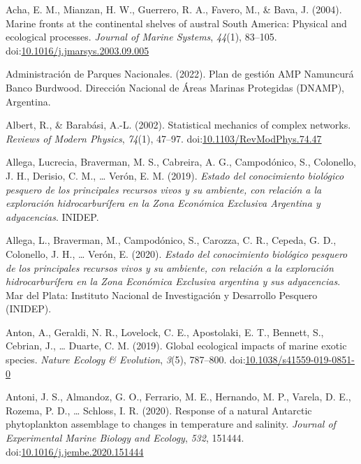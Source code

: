 \documentclass[
]{article}
\newlength{\cslhangindent}
\newlength{\cslentryspacingunit} %
\newenvironment{CSLReferences}[2] %
 {%
  \setlength{\parindent}{0pt}
  \ifodd #1
  \let\oldpar\par
  \def\par{\hangindent=\cslhangindent\oldpar}
  \fi
  \setlength{\parskip}{#2\cslentryspacingunit}
 }%
 {}
\begin{document}
\hypertarget{refs}{}
\begin{CSLReferences}{1}{0}
\leavevmode{}%
Acha, E. M., Mianzan, H. W., Guerrero, R. A., Favero, M., \& Bava, J.
(2004). Marine fronts at the continental shelves of austral {South
America}: {Physical} and ecological processes. \emph{Journal of Marine
Systems}, \emph{44}(1), 83--105.
doi:\href{https://doi.org/10.1016/j.jmarsys.2003.09.005}{10.1016/j.jmarsys.2003.09.005}

\leavevmode{}%
Administración de Parques Nacionales. (2022). {Plan de gestión AMP
Namuncurá Banco Burdwood}. {Dirección Nacional de Áreas Marinas
Protegidas (DNAMP), Argentina}.

\leavevmode{}%
Albert, R., \& Barabási, A.-L. (2002). Statistical mechanics of complex
networks. \emph{Reviews of Modern Physics}, \emph{74}(1), 47--97.
doi:\href{https://doi.org/10.1103/RevModPhys.74.47}{10.1103/RevModPhys.74.47}

\leavevmode{}%
Allega, Lucrecia, Braverman, M. S., Cabreira, A. G., Campodónico, S.,
Colonello, J. H., Derisio, C. M., \ldots{} Verón, E. M. (2019).
\emph{{Estado del conocimiento biológico pesquero de los principales
recursos vivos y su ambiente, con relación a la exploración
hidrocarburífera en la Zona Económica Exclusiva Argentina y
adyacencias}}. {INIDEP}.

\leavevmode{}%
Allega, L., Braverman, M., Campodónico, S., Carozza, C. R., Cepeda, G.
D., Colonello, J. H., \ldots{} Verón, E. (2020). \emph{{Estado del
conocimiento biológico pesquero de los principales recursos vivos y su
ambiente, con relación a la exploración hidrocarburífera en la Zona
Económica Exclusiva argentina y sus adyacencias}}. {Mar del Plata}:
{Instituto Nacional de Investigación y Desarrollo Pesquero (INIDEP)}.

\leavevmode{}%
Anton, A., Geraldi, N. R., Lovelock, C. E., Apostolaki, E. T., Bennett,
S., Cebrian, J., \ldots{} Duarte, C. M. (2019). Global ecological
impacts of marine exotic species. \emph{Nature Ecology \& Evolution},
\emph{3}(5), 787--800.
doi:\href{https://doi.org/10.1038/s41559-019-0851-0}{10.1038/s41559-019-0851-0}

\leavevmode{}%
Antoni, J. S., Almandoz, G. O., Ferrario, M. E., Hernando, M. P.,
Varela, D. E., Rozema, P. D., \ldots{} Schloss, I. R. (2020). Response
of a natural {Antarctic} phytoplankton assemblage to changes in
temperature and salinity. \emph{Journal of Experimental Marine Biology
and Ecology}, \emph{532}, 151444.
doi:\href{https://doi.org/10.1016/j.jembe.2020.151444}{10.1016/j.jembe.2020.151444}


\end{CSLReferences}
\end{document}
